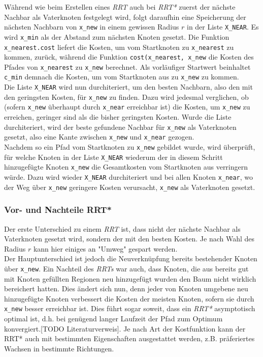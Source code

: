 Während wie beim Erstellen eines \textit{RRT} auch bei \textit{RRT*} zuerst der nächste Nachbar als Vaterknoten festgelegt wird, folgt daraufhin eine Speicherung der nächsten Nachbarn von \verb|x_new| in einem gewissen Radius $r$ in der Liste \verb|X_NEAR|. 
Es wird \verb|x_min| als der Abstand zum nächsten Knoten gesetzt. Die Funktion \verb|x_nearest.cost| liefert die Kosten, um vom Startknoten zu \verb|x_nearest| zu kommen, zurück, während die Funktion \verb|cost(x_nearest, x_new| die Kosten des Pfades von \verb|x_nearest| zu \verb|x_new| berechnet. Als vorläufiger Startwert beinhaltet \verb|c_min| demnach die Kosten, um vom Startknoten aus zu \verb|x_new| zu kommen. \\
Die Liste \verb|X_NEAR| wird nun durchiteriert, um den besten Nachbarn, also den mit den geringsten Kosten, für \verb|x_new| zu finden. Dazu wird jedesmal verglichen, ob (sofern \verb|x_new| überhaupt durch \verb|x_near| erreichbar ist) die Kosten, um \verb|x_new| zu erreichen, geringer sind als die bisher geringsten Kosten. Wurde die Liste durchiteriert, wird der beste gefundene Nachbar für \verb|x_new| als Vaterknoten gesetzt, also eine Kante zwischen \verb|x_new| und \verb|x_near| gezogen. \\
Nachdem so ein Pfad vom Startknoten zu \verb|x_new| gebildet wurde, wird überprüft, für welche Knoten in der Liste \verb|X_NEAR| wiederum der in diesem Schritt hinzugefügte Knoten \verb|x_new| die Gesamtkosten vom Startknoten aus verringern würde. Dazu wird wieder \verb|X_NEAR| durchiteriert und bei allen Knoten \verb|x_near|, wo der Weg über \verb|x_new| geringere Kosten verursacht, \verb|x_new| als Vaterknoten gesetzt.
\subsubsection{Vor- und Nachteile RRT*}
Der erste Unterschied zu einem \textit{RRT} ist, dass nicht der nächste Nachbar als Vaterknoten gesetzt wird, sondern der mit den besten Kosten. Je nach Wahl des Radius $r$ kann hier einiges an "Umweg" gespart werden. \\
Der Hauptunterschied ist jedoch die Neuverknüpfung bereits bestehender Knoten über \verb|x_new|. Ein Nachteil des \textit{RRTs} war auch, dass Knoten, die aus bereits gut mit Knoten gefüllten Regionen neu hinzugefügt wurden den Baum nicht wirklich bereichert hatten. Dies ändert sich nun, denn jeder von Knoten umgebene neu hinzugefügte Knoten verbessert die Kosten der meisten Knoten, sofern sie durch \verb|x_new| besser erreichbar ist. Dies führt sogar soweit, dass ein \textit{RRT*} asymptotisch optimal ist, d.h. bei genügend langer Laufzeit der Pfad zum Optimum konvergiert.[TODO Literaturverweis]. Je nach Art der Kostfunktion kann der RRT* auch mit bestimmten Eigenschaften ausgestattet werden, z.B. präferiertes Wachsen in bestimmte Richtungen.
